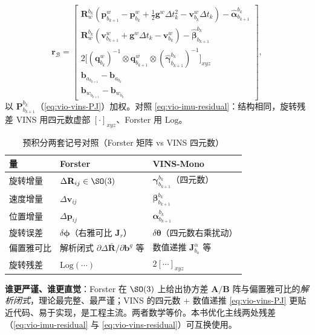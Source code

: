 \begin{equation}
  \mathbf{r}_{\mathcal{B}}=\begin{bmatrix}
  \mathbf{R}^{b_k}_w(\mathbf{p}^w_{b_{k+1}}-\mathbf{p}^w_{b_k}+\tfrac12\mathbf{g}^w\Delta t_k^2-\mathbf{v}^w_{b_k}\Delta t_k)-\hat{\boldsymbol{\alpha}}^{b_k}_{b_{k+1}}\\
  \mathbf{R}^{b_k}_w(\mathbf{v}^w_{b_{k+1}}+\mathbf{g}^w\Delta t_k-\mathbf{v}^w_{b_k})-\hat{\boldsymbol{\beta}}^{b_k}_{b_{k+1}}\\
  2\big[(\mathbf{q}^w_{b_k})^{-1}\otimes\mathbf{q}^w_{b_{k+1}}\otimes(\hat{\boldsymbol{\gamma}}^{b_k}_{b_{k+1}})^{-1}\big]_{xyz}\\
  \mathbf{b}_{a_{b_{k+1}}}-\mathbf{b}_{a_{b_k}}\\
  \mathbf{b}_{w_{b_{k+1}}}-\mathbf{b}_{w_{b_k}}
  \end{bmatrix},
  \label{eq:vio-vins-residual}
\end{equation}
以 $\mathbf{P}^{b_k}_{b_{k+1}}$（\cref{eq:vio-vins-PJ}）加权。对照 \cref{eq:vio-imu-residual}：结构相同，旋转残差 VINS 用四元数虚部 $[\cdot]_{xyz}$、Forster 用 $\mathrm{Log}$。

\begin{table}[H]\centering\small
\caption{预积分两套记号对照（Forster 矩阵 vs VINS 四元数）}
\label{tab:vio-preint-compare}
\begin{tabular}{lll}
\toprule
量 & Forster\cite{forster2017preintegration} & VINS-Mono\cite{qin2018vins} \\
\midrule
旋转增量 & $\Delta\mathbf{R}_{ij}\in\SO(3)$ & $\boldsymbol{\gamma}^{b_k}_{b_{k+1}}$（四元数） \\
速度增量 & $\Delta\mathbf{v}_{ij}$ & $\boldsymbol{\beta}^{b_k}_{b_{k+1}}$ \\
位置增量 & $\Delta\mathbf{p}_{ij}$ & $\boldsymbol{\alpha}^{b_k}_{b_{k+1}}$ \\
旋转误差 & $\delta\boldsymbol{\phi}$（右雅可比 $\mathbf{J}_r$） & $\delta\boldsymbol{\theta}$（四元数右乘扰动） \\
偏置雅可比 & 解析闭式 $\partial\Delta\bar{\mathbf{R}}/\partial\mathbf{b}^g$ 等 & 数值递推 $\mathbf{J}^\alpha_{b_a}$ 等 \\
旋转残差 & $\mathrm{Log}(\cdots)$ & $2[\cdots]_{xyz}$ \\
\bottomrule
\end{tabular}
\end{table}

\begin{note}
\textbf{谁更严谨、谁更直觉}：Forster\cite{forster2017preintegration} 在 $\SO(3)$ 上给出协方差 $\mathbf{A}/\mathbf{B}$ 阵与偏置雅可比的\emph{解析闭式}，理论最完整、最严谨；VINS\cite{qin2018vins} 的四元数 $+$ 数值递推 \cref{eq:vio-vins-PJ} 更贴近代码、易于实现，是工程主流。两者数学等价。本书优化主线两处残差（\cref{eq:vio-imu-residual} 与 \cref{eq:vio-vins-residual}）可互换使用。
\end{note}

